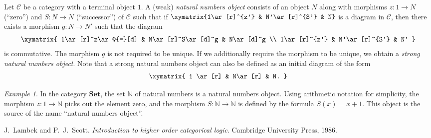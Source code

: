 \documentclass[12pt]{article}
\theoremstyle{remark}
\newtheorem*{example*}{Example}
\begin{document}
Let $\mathcal{C}$ be a category with a terminal object $1$.  A (weak) \emph{natural numbers object} consists of an object $N$ along with morphisms $z\colon 1\to N$ (``zero'') and $S\colon N\to N$ (``successor'') of $\mathcal{C}$ such that if $\xymatrix{1\ar[r]^{z'} & N'\ar[r]^{S'} & N}$ is a diagram in $\mathcal{C}$, then there exists a morphism $g\colon N\to N'$ such that the diagram
\[\xymatrix{
1\ar[r]^z\ar@{=}[d] & N\ar[r]^S\ar[d]^g  & N\ar[d]^g \\
1\ar[r]^{z'}        & N'\ar[r]^{S'}      & N'
}\]
is commutative.  The morphism $g$ is not required to be unique.  If we additionally require the morphism to be unique, we obtain a \emph{strong natural numbers object}.  Note that a strong natural numbers object can also be defined as an initial diagram of the form
\[\xymatrix{
1 \ar[r] & N\ar[r] & N.
}\]

\begin{example*}
In the category $\mathbf{Set}$, the set $\mathbb{N}$ of natural numbers is a natural numbers object.  Using arithmetic notation for simplicity, the morphism $z\colon 1\to\mathbb{N}$ picks out the element zero, and the morphism $S\colon\mathbb{N}\to\mathbb{N}$ is defined by the formula $S(x) = x + 1$.  This object is the source of the name ``natural numbers object''.
\end{example*}

\begin{thebibliography}{99}
J.~Lambek and P.~J.~Scott. {\it Introduction to higher order categorical logic}. Cambridge University Press, 1986.
\end{thebibliography}

\end{document}
